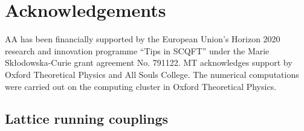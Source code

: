 \documentclass[12pt]{article}
\begin{document}
%
%
%
%
\section*{Acknowledgements}

AA has been financially supported by the European Union's Horizon 2020 research and innovation
programme ``Tips in SCQFT'' under the Marie Sk\l odowska-Curie grant agreement No. 791122.
MT acknowledges support by Oxford Theoretical Physics and All Souls College. The numerical
computations were carried out on the computing cluster in Oxford Theoretical Physics.

\clearpage



\begin{appendix}
\setcounter{table}{0}
\renewcommand{\thetable}{A\arabic{table}}


\section{Lattice running couplings}
\label{section_appendix_couplings}


\end{appendix}
\end{document}
